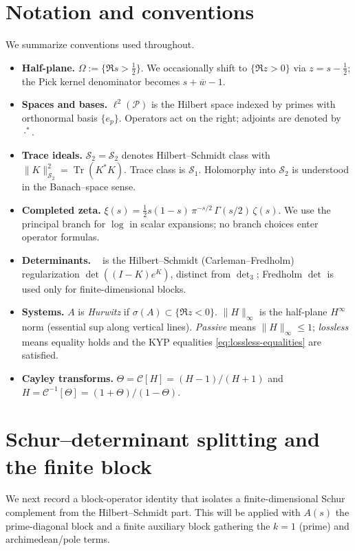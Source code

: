 \documentclass[11pt]{article}
\theoremstyle{remark}
\newcommand{\PP}{\mathcal{P}}
\newcommand{\HS}{\mathcal{S}_2}
\DeclareMathOperator{\Tr}{Tr}
\DeclareMathOperator{\dettwo}{det_2}
\begin{document}
\section{Notation and conventions}\label{sec:notation}
We summarize conventions used throughout.
\begin{itemize}
 \item \textbf{Half-plane.} \(\Omega:=\{\Re s>\tfrac12\}\). We occasionally shift to \(\{\Re z>0\}\) via \(z=s-\tfrac12\); the Pick kernel denominator becomes \(s+\overline{w}-1\).
 \item \textbf{Spaces and bases.} \(\ell^2(\PP)\) is the Hilbert space indexed by primes with orthonormal basis \(\{e_p\}\). Operators act on the right; adjoints are denoted by \(\cdot^*\).
 \item \textbf{Trace ideals.} \(\HS=\mathcal S_2\) denotes Hilbert--Schmidt class with \(\|K\|_{\HS}^2=\Tr(K^*K)\). Trace class is \(\mathcal S_1\). Holomorphy into \(\HS\) is understood in the Banach--space sense.
 \item \textbf{Completed zeta.} \(\xi(s)=\tfrac12 s(1-s)\,\pi^{-s/2}\,\Gamma(s/2)\,\zeta(s)\). We use the principal branch for \(\log\) in scalar expansions; no branch choices enter operator formulas.
\item \textbf{Determinants.} \(\dettwo\) is the Hilbert--Schmidt (Carleman--Fredholm) regularization \(\det((I-K)e^{K})\), distinct from \(\det_3\); Fredholm \(\det\) is used only for finite-dimensional blocks.
 \item \textbf{Systems.} \(A\) is \emph{Hurwitz} if \(\sigma(A)\subset\{\Re z<0\}\). \(\|H\|_\infty\) is the half-plane \(H^\infty\) norm (essential sup along vertical lines). \emph{Passive} means \(\|H\|_\infty\le 1\); \emph{lossless} means equality holds and the KYP equalities \eqref{eq:lossless-equalities} are satisfied.
 \item \textbf{Cayley transforms.} \(\Theta=\mathcal C[H]=(H-1)/(H+1)\) and \(H=\mathcal C^{-1}[\Theta]=(1+\Theta)/(1-\Theta)\).
\end{itemize}

\section{Schur--determinant splitting and the finite block}\label{sec:schur-split}
We next record a block-operator identity that isolates a finite-dimensional Schur complement from the Hilbert--Schmidt part. This will be applied with \(A(s)\) the prime-diagonal block and a finite auxiliary block gathering the \(k=1\) (prime) and archimedean/pole terms.
\end{document}
